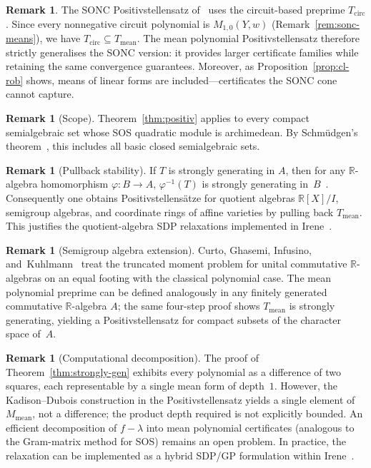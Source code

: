 \documentclass{amsart}
\theoremstyle{definition}
\newtheorem{rem}[thm]{Remark}
\numberwithin{equation}{section}
\newcommand{\reals}{\mathbb{R}}
\begin{document}
\begin{rem}\label{rem:sonc-generalisation}
The SONC Positivstellensatz of~\cite{DIdW02} uses the circuit-based preprime
$T_{\mathrm{circ}}$.  Since every nonnegative circuit polynomial is
$M_{1,0}(Y,w)$ (Remark~\ref{rem:sonc-means}), we have
$T_{\mathrm{circ}}\subseteq T_{\mathrm{mean}}$.  The mean polynomial
Positivstellensatz therefore strictly generalises the SONC version: it
provides larger certificate families while retaining the same convergence
guarantees.  Moreover, as Proposition~\ref{prop:cl-rob} shows, means of
linear forms are included---certificates the SONC cone cannot capture.
\end{rem}

\begin{rem}[Scope]\label{rem:scope}
Theorem~\ref{thm:positiv} applies to every compact semialgebraic set whose
SOS quadratic module is archimedean.  By Schm\"udgen's
theorem~\cite{Schm91}, this includes all basic closed semialgebraic sets.
\end{rem}

\begin{rem}[Pullback stability]\label{rem:pullback}
If $T$ is strongly generating in $A$, then for any $\reals$-algebra
homomorphism $\varphi\colon B\to A$, $\varphi^{-1}(T)$ is strongly generating
in~$B$~\cite[Proposition~2.2]{Marshall02}.  Consequently one obtains
Positivstellens\"atze for quotient algebras $\reals[X]/I$, semigroup
algebras, and coordinate rings of affine varieties by pulling back
$T_{\mathrm{mean}}$.  This justifies the quotient-algebra SDP relaxations
implemented in Irene~\cite{GMIr}.
\end{rem}

\begin{rem}[Semigroup algebra extension]\label{rem:cgik}
Curto, Ghasemi, Infusino, and~Kuhlmann~\cite{CGIK} treat the truncated
moment problem for unital commutative $\reals$-algebras on an equal footing
with the classical polynomial case.  The mean polynomial preprime can be
defined analogously in any finitely generated commutative $\reals$-algebra
$A$; the same four-step proof shows $T_{\mathrm{mean}}$ is strongly
generating, yielding a Positivstellensatz for compact subsets of the
character space of~$A$.
\end{rem}

\begin{rem}[Computational decomposition]\label{rem:efficient}
The proof of Theorem~\ref{thm:strongly-gen} exhibits every polynomial as a
difference of two squares, each representable by a single mean form of
depth~$1$.  However, the Kadison--Dubois construction in the
Positivstellensatz yields a single element of $M_{\mathrm{mean}}$, not a
difference; the product depth required is not explicitly bounded.  An
efficient decomposition of $f-\lambda$ into mean polynomial certificates
(analogous to the Gram-matrix method for SOS) remains an open problem.  In
practice, the relaxation can be implemented as a hybrid SDP/GP formulation
within Irene~\cite{GMIr}.
\end{rem}
\end{document}
